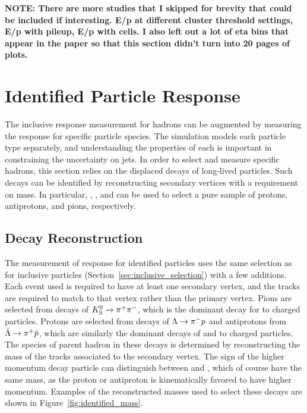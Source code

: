 \textbf{NOTE: There are more studies that I skipped for brevity that could be included if interesting. E/p at different cluster threshold settings, E/p with pileup, E/p with cells. I also left out a lot of eta bins that appear in the paper so that this section didn't turn into 20 pages of plots.}


\section{Identified Particle Response}
\label{sec:identified}

The inclusive response measurement for hadrons can be augmented by measuring the response for specific particle species. 
The simulation models each particle type separately, and understanding the properties of each is important in constraining the uncertainty on jets. 
In order to select and measure specific hadrons, this section relies on the displaced decays of long-lived particles. 
Such decays can be identified by reconstructing secondary vertices with a requirement on mass.
In particular, \pL, \pLB, and \pKS can be used to select a pure sample of protons, antiprotons, and pions, respectively. 

\subsection{Decay Reconstruction}
The measurement of response for identified particles uses the same selection as for inclusive particles (Section~\ref{sec:inclusive_selection}) with a few additions.
Each event used is required to have at least one secondary vertex, and the tracks are required to match to that vertex rather than the primary vertex.
Pions are selected from decays of $K_\text{S}^{0} \rightarrow \pi^+ \pi^-$, which is the dominant decay for \pKS to charged particles.
Protons are selected from decays of $\Lambda \rightarrow \pi^- p$ and antiprotons from $\bar{\Lambda} \rightarrow \pi^+ \bar{p}$, which are similarly the dominant decays of \pL and \pLB to charged particles.
The species of parent hadron in these decays is determined by reconstructing the mass of the tracks associated to the secondary vertex.
The sign of the higher momentum decay particle can distinguish between \pL and \pLB, which of course have the same mass, as the proton or antiproton is kinematically favored to have higher momentum.
Examples of the reconstructed masses used to select these decays are shown in Figure~\ref{fig:identified_mass}. 

